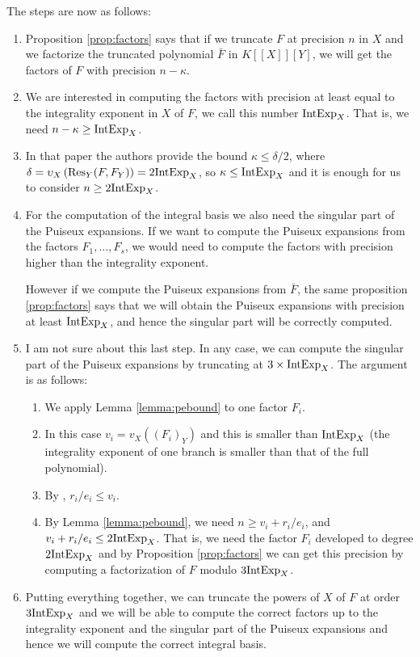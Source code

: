 \documentclass[a4paper,11pt,reqno]{amsart}%
\theoremstyle{definition}
\theoremstyle{plain}
\theoremstyle{remark}
\newcommand\ct[1]{\text{\rmfamily\upshape #1}}
\newcommand{\IntExpX}{\ct{IntExp}_X}
\begin{document}
The steps are now as follows:
\begin{enumerate}
\item
Proposition \ref{prop:factors} says that if we truncate $F$ at precision $n$ in $X$ and we factorize the truncated polynomial $\bar F$ in $K[[X]][Y]$, we will get the factors of $F$ with precision $n - \kappa$.

\item
We are interested in computing the factors with precision at least equal to the integrality exponent in $X$ of $F$, we call this number $\IntExpX$. That is, we need
$n - \kappa \ge \IntExpX$.

\item In that paper the authors provide the bound $\kappa \le \delta / 2$, where $\delta = \upsilon_X \left( \operatorname{Res}_Y(F, F_Y) \right) = 2 \IntExpX$, so $\kappa \le \IntExpX$ and it is enough for us to consider $n \ge 2 \IntExpX$.

\item
For the computation of the integral basis we also need the singular part of the Puiseux expansions. If we want to compute the Puiseux expansions from the factors $F_1, \dots, F_s$, we would need to compute the factors with precision higher than the integrality exponent.

However if we compute the Puiseux expansions from $\bar F$, the same proposition \ref{prop:factors} says that we will obtain the Puiseux expansions with precision at least $\IntExpX$, and hence the singular part will be correctly computed.

\item I am not sure about this last step. In any case, we can compute the singular part of the Puiseux expansions by truncating at $3 \times \IntExpX$. The argument is as follows:

    \begin{enumerate}
    \item We apply Lemma \ref{lemma:pebound} to one factor $F_i$.
    \item In this case $v_i = v_X({(F_i)}_Y)$ and this is smaller than $\IntExpX$ (the integrality exponent of one branch is smaller than that of the full polynomial).
    \item By \cite[Lemma 3.21]{poteaux2021}, $r_i / e_i \le v_i$.
    \item By Lemma \ref{lemma:pebound}, we need $n \ge v_i + r_i/e_i$, and $v_i + r_i/e_i \le 2 \IntExpX$. That is, we need the factor $F_i$ developed to degree $2 \IntExpX$ and by Proposition \ref{prop:factors} we can get this precision by computing a factorization of $F$ modulo $3 \IntExpX$.
    \end{enumerate}

\item Putting everything together, we can truncate the powers of $X$ of $F$ at order $3 \IntExpX$ and we will be able to compute the correct factors up to the integrality exponent and the singular part of the Puiseux expansions and hence we will compute the correct integral basis.
\end{enumerate}
\end{document}
